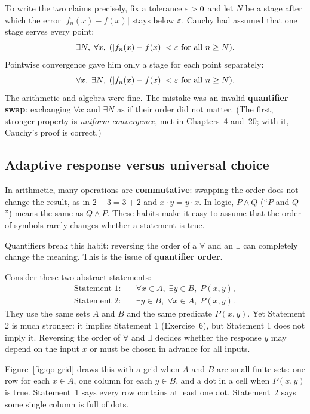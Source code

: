 To write the two claims precisely, fix a tolerance $\varepsilon > 0$ and let $N$ be a stage after which the error $|f_n(x) - f(x)|$ stays below $\varepsilon$.
Cauchy had assumed that one stage serves every point:
\[
\exists N, \; \forall x, \; (|f_n(x) - f(x)| < \varepsilon \text{ for all } n \ge N).
\]
Pointwise convergence gave him only a stage for each point separately:
\[
\forall x, \; \exists N, \; (|f_n(x) - f(x)| < \varepsilon \text{ for all } n \ge N).
\]
The arithmetic and algebra were fine. The mistake was an invalid \textbf{quantifier swap}: exchanging $\forall x$ and $\exists N$ as if their order did not matter. (The first, stronger property is \emph{uniform convergence}, met in Chapters~4 and~20; with it, Cauchy's proof is correct.)

\subsection{Adaptive response versus universal choice}

In arithmetic, many operations are \textbf{commutative}: swapping the order does not change the result, as in $2 + 3 = 3 + 2$ and $x \cdot y = y \cdot x$. In logic, $P \land Q$ (``$P$ and $Q$'') means the same as $Q \land P$. These habits make it easy to assume that the order of symbols rarely changes whether a statement is true.

Quantifiers break this habit: reversing the order of a $\forall$ and an $\exists$ can completely change the meaning. This is the issue of \textbf{quantifier order}.

Consider these two abstract statements:
\begin{align*}
\text{Statement 1}: &\quad \forall x \in A, \; \exists y \in B, \; P(x, y), \\
\text{Statement 2}: &\quad \exists y \in B, \; \forall x \in A, \; P(x, y).
\end{align*}
They use the same sets $A$ and $B$ and the same predicate $P(x, y)$. Yet Statement 2 is much stronger: it implies Statement 1 (Exercise~6), but Statement 1 does not imply it. Reversing the order of $\forall$ and $\exists$ decides whether the response $y$ may depend on the input $x$ or must be chosen in advance for all inputs.

Figure~\ref{fig:qo-grid} draws this with a grid when $A$ and $B$ are small finite sets: one row for each $x \in A$, one column for each $y \in B$, and a dot in a cell when $P(x, y)$ is true. Statement~1 says every row contains at least one dot. Statement~2 says some single column is full of dots.

